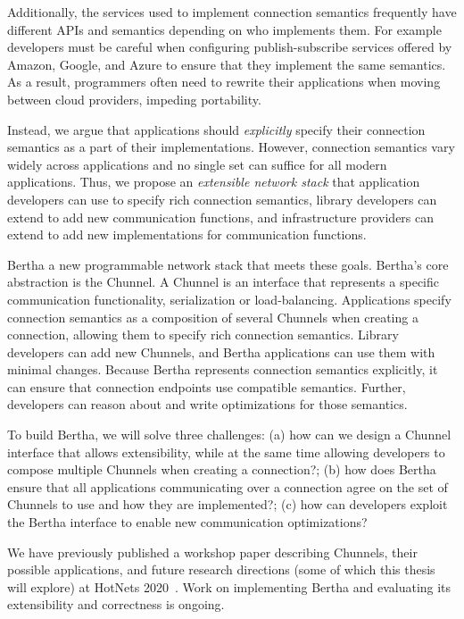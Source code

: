 \documentclass[fontsize=12pt,paper=letter]{scrartcl}
\newcommand{\tunnel}{Chunnel\xspace}
\newcommand{\tunnels}{Chunnels\xspace}
\begin{document}
Additionally, the services used to implement connection semantics frequently have different APIs and semantics depending on who implements them. 
For example developers must be careful when configuring publish-subscribe services offered by Amazon, Google, and Azure to ensure that they implement the same semantics. As a result, programmers often need to rewrite their applications when moving between cloud providers, impeding portability. 

Instead, we argue that applications should \emph{explicitly} specify their connection semantics as a part of their implementations. However, connection semantics vary widely across applications and no single set can suffice for all modern applications.
Thus, we propose an \emph{extensible network stack} that application developers can use to specify rich connection semantics, library developers can extend to add new communication functions, and infrastructure providers can extend to add new implementations for communication functions.

Bertha a new programmable network stack that meets these goals.
Bertha's core abstraction is the \tunnel. A \tunnel is an interface that represents a specific communication functionality, \eg serialization or load-balancing. Applications specify connection semantics as a composition of several \tunnels when creating a connection, allowing them to specify rich connection semantics. Library developers can add new \tunnels, and
Bertha applications can use them with minimal changes.
Because Bertha represents connection semantics explicitly, it can ensure that connection endpoints use compatible semantics. Further, developers can reason about and write optimizations for those semantics. 

To build Bertha, we will solve three challenges: (a) how can we design a \tunnel interface that allows extensibility, while at the same time allowing developers to compose multiple \tunnels when creating a connection?; (b) how does Bertha ensure that all applications communicating over a connection agree on the set of \tunnels to use and how they are implemented?; (c) how can developers exploit the Bertha interface to enable new communication optimizations? 

We have previously published a workshop paper describing \tunnels, their possible applications, and future research directions (some of which this thesis will explore) at HotNets 2020~\cite{bertha-hotnets}. 
Work on implementing Bertha and evaluating its extensibility and correctness is ongoing.
\end{document}
